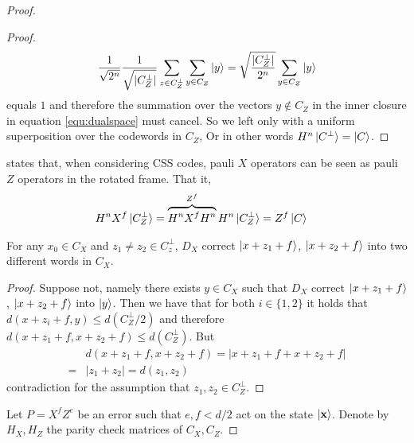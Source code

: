 \begin{proof}
\begin{proof}
       \begin{equation}
         \begin{split}
           \frac{1}{ \sqrt{ 2^{n}}} \frac{1}{\sqrt{|C_{Z}^{\perp}|}} \sum_{z \in C_{Z}^{\perp}}{  \sum_{y \in C_{Z}}{  \ket{y}  }  } = \sqrt{\frac{ |C_{Z}^{\perp}|}{2^{n}}}  \sum_{y \in C_{Z}}{  \ket{y}  }  
         \end{split}
       \end{equation} equals $1$ and therefore the summation over the vectors $y \not\in C_{Z}$ in the inner closure in equation \ref{equ:dualspace} must cancel. So we left only with a uniform superposition over the codewords in $C_{Z}$, Or in other words $H^{n}\ket{C^{\perp}} = \ket{C}$.  
    \end{proof}
   states that, when considering CSS codes,  pauli $X$ operators can be seen as pauli $Z$ operators in the rotated frame. That it, \begin{equation*}
    \begin{split}
      H^{n} X^{f} \ket{ C_{Z}^{\perp} } & =  \overbrace{H^{n}X^{f}H^{n}}^{ Z^{f}} H^{n} \ket{C^{\perp}_{Z} }  = Z^{f}\ket{C}
    \end{split}
  \end{equation*}
    \begin{claim}
      For any $x_{0} \in C_{X}$ and $z_{1}\neq z_{2} \in C_{z}^{\perp}$, $D_{X}$ correct $\ket{x+z_{1}+f}$, $\ket{x+z_{2}+f}$ into two different words in $C_{X}$. 
    \begin{proof}
      Suppose not, namely there exists $y \in C_{X}$ such that $D_{X}$ correct $\ket{x+z_{1}+f}$, $\ket{x+z_{2}+f}$ into $\ket{y}$. Then we have that for both $i\in \{1,2\}$ it holds that  $d\left( x+z_{i} +f, y \right) \le d\left( C_{Z}^{\perp}/2 \right)$ and therefore $ d\left( x + z_{1} + f, x+z_{2} +f  \right) \le d\left( C_{Z}^{\perp} \right)$. But
      \begin{equation*}
        \begin{split}
            & d\left( x + z_{1} + f, x+z_{2} +f  \right) =  | x + z_{1} + f + x + z_{2} + f | \\
            =  & | z_{1} + z_{2} | = d\left( z_{1},z_{2} \right) 
        \end{split}
      \end{equation*}     
      contradiction for the assumption that $z_{1},z_{2} \in C_{Z}^{\perp}$.   
    \end{proof}
    \end{claim} 
    Let $P = X^{f}Z^{e}$ be an error such that $e, f < d/2$ act on the state $\ket{\mathbf{x}}$. Denote by $H_{X}, H_{Z}$ the parity check matrices of $C_{X},C_{Z}$. 

\end{proof}
